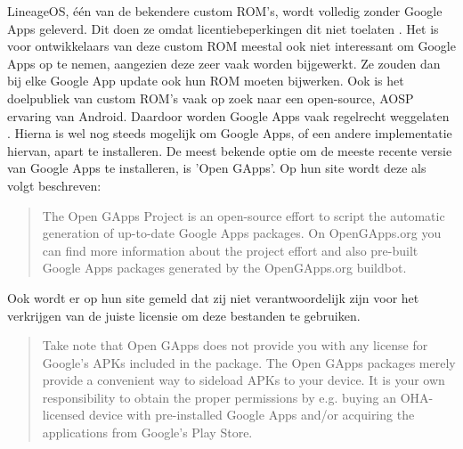 LineageOS, één van de bekendere custom ROM's, wordt volledig zonder Google Apps geleverd. Dit doen ze omdat licentiebeperkingen dit niet toelaten \autocite{lineage_google-apps}. Het is voor ontwikkelaars van deze custom ROM meestal ook niet interessant om Google Apps op te nemen, aangezien deze zeer vaak worden bijgewerkt. Ze zouden dan bij elke Google App update ook hun ROM moeten bijwerken. Ook is het doelpubliek van custom ROM's vaak op zoek naar een open-source, AOSP ervaring van Android. Daardoor worden Google Apps vaak regelrecht weggelaten \autocite{cawley_gapps}. Hierna is wel nog steeds mogelijk om Google Apps, of een andere implementatie hiervan, apart te installeren. De meest bekende optie om de meeste recente versie van Google Apps te installeren, is 'Open GApps'. Op hun site wordt deze als volgt beschreven: \blockcquote{opengapps_about}{
    The Open GApps Project is an open-source effort to script the automatic generation of up-to-date Google Apps packages.
    On OpenGApps.org you can find more information about the project effort and also pre-built Google Apps packages generated by the OpenGApps.org buildbot.
}
Ook wordt er op hun site gemeld dat zij niet verantwoordelijk zijn voor het verkrijgen van de juiste licensie om deze bestanden te gebruiken.
\blockcquote{opengapps_about}{
    Take note that Open GApps does not provide you with any license for Google’s APKs included in the package. The Open GApps packages merely provide a convenient way to sideload APKs to your device. It is your own responsibility to obtain the proper permissions by e.g. buying an OHA-licensed device with pre-installed Google Apps and/or acquiring the applications from Google’s Play Store.
}

